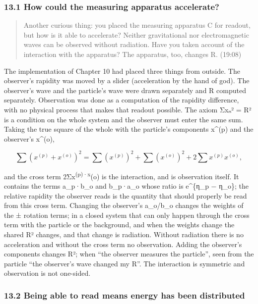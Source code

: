 \documentclass[
  a4paper,
]{article}
\begin{document}
\subsubsection{13.1 How could the measuring apparatus
accelerate?}\label{how-could-the-measuring-apparatus-accelerate}

\begin{quote}
Another curious thing: you placed the measuring apparatus C for readout,
but how is it able to accelerate? Neither gravitational nor
electromagnetic waves can be observed without radiation. Have you taken
account of the interaction with the apparatus? The apparatus, too,
changes R. (19:08)
\end{quote}

The implementation of Chapter 10 had placed three things from outside.
The observer's rapidity was moved by a slider (acceleration by the hand
of god). The observer's wave and the particle's wave were drawn
separately and R computed separately. Observation was done as a
computation of the rapidity difference, with no physical process that
makes that readout possible. The axiom Σxₙ² = R² is a condition on the
whole system and the observer must enter the same sum. Taking the true
square of the whole with the particle's components x\^{}(p) and the
observer's x\^{}(o),

\[
\sum\left(x^{(p)}+x^{(o)}\right)^2=\sum\left(x^{(p)}\right)^2+\sum\left(x^{(o)}\right)^2+2\sum x^{(p)}x^{(o)},
\]

and the cross term 2Σx\textsuperscript{(p)·x}(o) is the interaction, and
is observation itself. It contains the terms a\_p·b\_o and b\_p·a\_o
whose ratio is e\^{}\{η\_p − η\_o\}; the relative rapidity the observer
reads is the quantity that should properly be read from this cross term.
Changing the observer's a\_o/b\_o changes the weights of the ± rotation
terms; in a closed system that can only happen through the cross term
with the particle or the background, and when the weights change the
shared R² changes, and that change is radiation. Without radiation there
is no acceleration and without the cross term no observation. Adding the
observer's components changes R²; when ``the observer measures the
particle'', seen from the particle ``the observer's wave changed my R''.
The interaction is symmetric and observation is not one-sided.

\subsubsection{13.2 Being able to read means energy has been
distributed}\label{being-able-to-read-means-energy-has-been-distributed}
\end{document}
